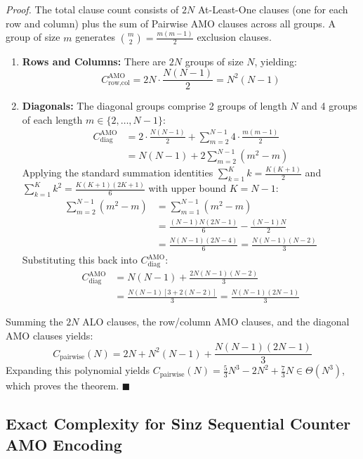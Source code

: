 \textit{Proof.} The total clause count consists of $2N$ At-Least-One clauses (one for each row and column) plus the sum of Pairwise AMO clauses across all groups. A group of size $m$ generates $\binom{m}{2} = \frac{m(m-1)}{2}$ exclusion clauses.
\begin{enumerate}
    \item \textbf{Rows and Columns:} There are $2N$ groups of size $N$, yielding:
    \begin{equation}
    C_{\text{row,col}}^{\text{AMO}} = 2N \cdot \frac{N(N-1)}{2} = N^2(N-1)
    \end{equation}
    \item \textbf{Diagonals:} The diagonal groups comprise 2 groups of length $N$ and 4 groups of each length $m \in \{2, \dots, N-1\}$:
    \begin{align}
    C_{\text{diag}}^{\text{AMO}} &= 2 \cdot \frac{N(N-1)}{2} + \sum_{m=2}^{N-1} 4 \cdot \frac{m(m-1)}{2} \nonumber \\
    &= N(N-1) + 2 \sum_{m=2}^{N-1} (m^2 - m)
    \end{align}
    Applying the standard summation identities $\sum_{k=1}^K k = \frac{K(K+1)}{2}$ and $\sum_{k=1}^K k^2 = \frac{K(K+1)(2K+1)}{6}$ with upper bound $K = N-1$:
    \begin{align}
    \sum_{m=2}^{N-1} (m^2 - m) &= \sum_{m=1}^{N-1} (m^2 - m) \nonumber \\
    &= \frac{(N-1)N(2N-1)}{6} - \frac{(N-1)N}{2} \nonumber \\
    &= \frac{N(N-1)(2N - 4)}{6} = \frac{N(N-1)(N-2)}{3}
    \end{align}
    Substituting this back into $C_{\text{diag}}^{\text{AMO}}$:
    \begin{align}
    C_{\text{diag}}^{\text{AMO}} &= N(N-1) + \frac{2N(N-1)(N-2)}{3} \nonumber \\
    &= \frac{N(N-1)[3 + 2(N-2)]}{3} = \frac{N(N-1)(2N-1)}{3}
    \end{align}
\end{enumerate}
Summing the $2N$ ALO clauses, the row/column AMO clauses, and the diagonal AMO clauses yields:
\begin{equation}
C_{\text{pairwise}}(N) = 2N + N^2(N-1) + \frac{N(N-1)(2N-1)}{3}
\end{equation}
Expanding this polynomial yields $C_{\text{pairwise}}(N) = \frac{5}{3}N^3 - 2N^2 + \frac{7}{3}N \in \Theta(N^3)$, which proves the theorem. \hfill $\blacksquare$

\subsection{Exact Complexity for Sinz Sequential Counter AMO Encoding}
\label{subsec:proof_sequential}

